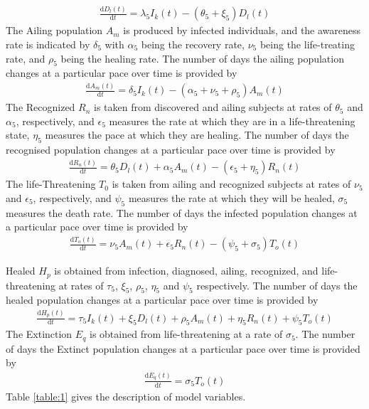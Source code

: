 \documentclass{article}
\begin{document}
\begin{align}
 \frac{\text{d}D_l(t)}{\text{d}t} =\lambda_5 I_k(t) -(\theta_5 + \xi_5)D_l(t)   
\end{align} 
 The Ailing population $A_m$ is produced by infected individuals, and the awareness rate is indicated by $\delta_5$ with $\alpha_5$ being the recovery rate, $\nu_5$ being the life-treating rate, and $\rho_5$ being the healing rate. The number of days the ailing population changes at a particular pace over time is provided by\\
\begin{align}
    \frac{\text{d}A_m(t)}{\text{d}t} = \delta_5 I_k(t) -(\alpha_5 + \nu_5 + \rho_5)A_m(t)
 \end{align}
 The Recognized $R_n$ is taken from discovered and ailing subjects at rates of $\theta_5$ and $\alpha_5$, respectively, and $\epsilon_5$ measures the rate at which they are in a life-threatening state, $\eta_5$ measures the pace at which they are healing. The number of days the recognised population changes at a particular pace over time is provided by\\
\begin{align}
  \frac{\text{d}R_n(t)}{\text{d}t} = \theta_5 D_l(t) + \alpha_5 A_m(t) -(\epsilon_5 + \eta_5)R_n(t)  
 \end{align}
 The life-Threatening $T_0$ is taken from ailing and recognized subjects at rates of $\nu_5$ and $\epsilon_5$, respectively, and $\psi_5$ measures the rate at which they will be healed, $\sigma_5$ measures the death rate. The number of days the infected population changes at a particular pace over time is provided by\\
 \begin{align}
   \frac{\text{d}T_o(t)}{\text{d}t} = \nu_5 A_m(t) +\epsilon_5 R_n(t) - (\psi_5 + \sigma_5)T_o(t)
 \end{align}

 Healed $H_p$ is obtained from infection, diagnosed, ailing, recognized, and life-threatening at rates of $\tau_5$, $\xi_5$, $\rho_5$, $\eta_5$ and $\psi_5$ respectively. The number of days the healed population changes at a particular pace over time is provided by\\
\begin{align}
   \frac{\text{d}H_p(t)}{\text{d}t} = \tau_5 I_k(t) + \xi_5 D_l(t) + \rho_5 A_m(t) + \eta_5 R_n(t) + \psi_5 T_o(t)
 \end{align}
 The Extinction $E_q$ is obtained from life-threatening at a rate of $\sigma_5$. The number of days the Extinct population changes at a particular pace over time is provided by\\
\begin{align}
   \frac{\text{d}E_q(t)}{\text{d}t} = \sigma_5 T_o(t)  
 \end{align}
Table \ref{table:1} gives the description of model variables. 
\end{document}
